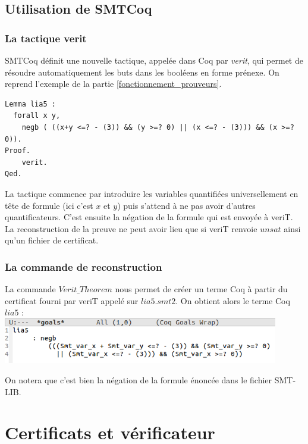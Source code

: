 \documentclass[11pt]{article}
\begin{document}
\subsection{Utilisation de SMTCoq}

\subsubsection{La tactique verit}

SMTCoq définit une nouvelle tactique, appelée dans Coq par \textit{verit}, qui permet de résoudre automatiquement les buts dans les booléens en forme prénexe. On reprend l'exemple de la partie \ref{fonctionnement_prouveurs}.


\begin{lstlisting}[frame=single]
Lemma lia5 : 
  forall x y,
    negb ( ((x+y <=? - (3)) && (y >=? 0) || (x <=? - (3))) && (x >=? 0)).
Proof.
    verit.
Qed.
\end{lstlisting}

La tactique commence par introduire les variables quantifiées universellement en tête de formule (ici c'est $x$ et $y$) puis s'attend à ne pas avoir d'autres quantificateurs. C'est ensuite la négation de la formule qui est envoyée à veriT. La reconstruction de la preuve ne peut avoir lieu que si veriT renvoie $unsat$ ainsi qu'un fichier de certificat.

\subsubsection{La commande de reconstruction}

La commande $Verit\_Theorem$ nous permet de créer un terme Coq à partir du certificat fourni par veriT appelé sur $lia5.smt2$. On obtient alors le terme Coq $lia5$ : \\

\includegraphics[height=2cm]{checklia5.png}

On notera que c'est bien la négation de la formule énoncée dans le fichier SMT-LIB. 


\newpage
\section{Certificats et vérificateur}
\end{document}
